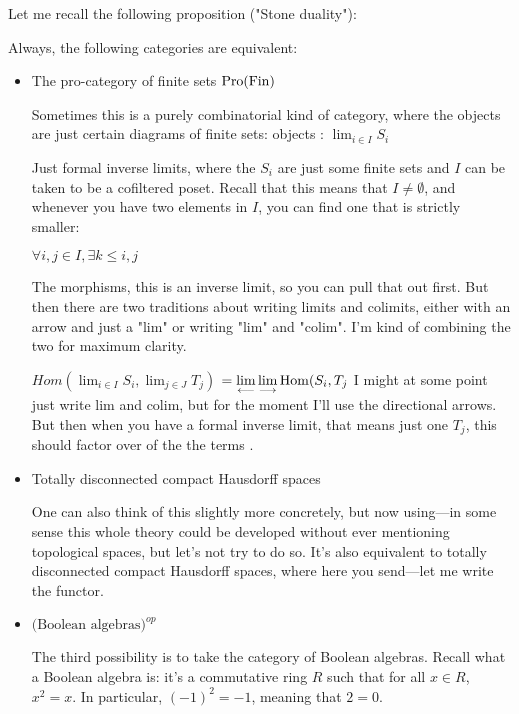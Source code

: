 \begin{proposition}
Let me recall the following proposition ("Stone duality"):

Always, the following categories are equivalent: 
\begin{itemize}
\item The pro-category of finite sets $\operatorname{Pro}(\operatorname{Fin})$

Sometimes this is a purely combinatorial kind of category, where the objects are just certain diagrams of finite sets:
objects : $\lim_{i \in I} S_i $

Just formal inverse limits, where the $S_i$ are just some finite sets and $I$ can be taken to be a cofiltered poset. Recall that this means that $I \neq \emptyset$, and whenever you have two elements in $I$, you can find one that is strictly smaller:

$\forall i, j \in I, \exists k \leq i,j$

The morphisms, this is an inverse limit, so you can pull that out first. But then there are two traditions about writing limits and colimits, either with an arrow and just a "lim" or writing "lim" and "colim". I'm kind of combining the two for maximum clarity. 

$Hom(\lim_{i \in I} S_i ,\lim_{j \in J} T_j ) $
$ = \mathop{\operatorname*{lim}\limits_{\longleftarrow}}\limits \mathop{\operatorname*{lim}\limits_{\longrightarrow}}\limits \operatorname{Hom} (S_i, T_j$
I might at some point just write lim and colim, but for the moment I'll use the directional arrows. But then when you have a formal inverse limit, that means just  one $T_j$, this should factor over of the the terms .

\item Totally disconnected compact Hausdorff spaces

One can also think of this slightly more concretely, but now using---in some sense this whole theory could be developed without ever mentioning topological spaces, but let's not try to do so. It's also equivalent to totally disconnected compact Hausdorff spaces, where here you send---let me write the functor. 

\item $\text{(Boolean algebras)}^{op}$ 

The third possibility is to take the category of Boolean algebras. Recall what a Boolean algebra is: it's a commutative ring $R$ such that for all $x \in R$, $x^2 = x$. In particular, $(-1)^2 = -1$, meaning that $2 = 0$. 
\end{itemize}

\end{proposition}

